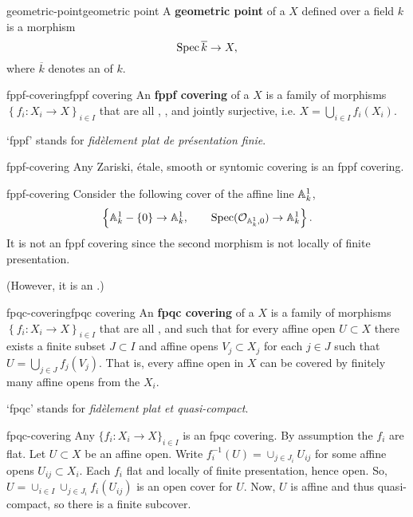 \begin{topic}{geometric-point}{geometric point}
    A \textbf{geometric point} of a  $X$ defined over a field $k$ is a morphism
    \[ \Spec \overline{k} \to X , \]
    where $\overline{k}$ denotes an  of $k$.
\end{topic}

\begin{topic}{fppf-covering}{fppf covering}
    An \textbf{fppf covering} of a  $X$ is a family of morphisms $\left\{ f_i : X_i \to X \right\}_{i \in I}$ that are all , , and jointly surjective, i.e. $X = \bigcup_{i \in I} f_i(X_i)$.
    
    `fppf' stands for \textit{fidèlement plat de présentation finie}.
\end{topic}

\begin{example}{fppf-covering}
    Any Zariski, étale, smooth or syntomic covering is an fppf covering.
\end{example}

\begin{example}{fppf-covering}
    Consider the following cover of the affine line $\AA^1_k$,
    \[ \left\{ \AA^1_k - \{ 0 \} \to \AA^1_k, \qquad \Spec(\mathcal{O}_{\AA^1_k, 0}) \to \AA^1_k \right\} . \]
    It is not an fppf covering since the second morphism is not locally of finite presentation.
    
    (However, it is an .)
\end{example}

\begin{topic}{fpqc-covering}{fpqc covering}
    An \textbf{fpqc covering} of a  $X$ is a family of morphisms $\left\{ f_i : X_i \to X \right\}_{i \in I}$ that are all , and such that for every affine open $U \subset X$ there exists a finite subset $J \subset I$ and affine opens $V_j \subset X_j$ for each $j \in J$ such that $U = \bigcup_{j \in J} f_j(V_j)$. That is, every affine open in $X$ can be covered by finitely many affine opens from the $X_i$.
    
    `fpqc' stands for \textit{fidèlement plat et quasi-compact}.
\end{topic}

\begin{example}{fpqc-covering}
    Any  $\{ f_i : X_i \to X \}_{i \in I}$ is an fpqc covering. By assumption the $f_i$ are flat. Let $U \subset X$ be an affine open. Write $f_i^{-1}(U) = \cup_{j \in J_i} U_{ij}$ for some affine opens $U_{ij} \subset X_i$. Each $f_i$ flat and locally of finite presentation, hence open. So, $U = \cup_{i \in I} \cup_{j \in J_i} f_i(U_{ij})$ is an open cover for $U$. Now, $U$ is affine and thus quasi-compact, so there is a finite subcover.
\end{example}

